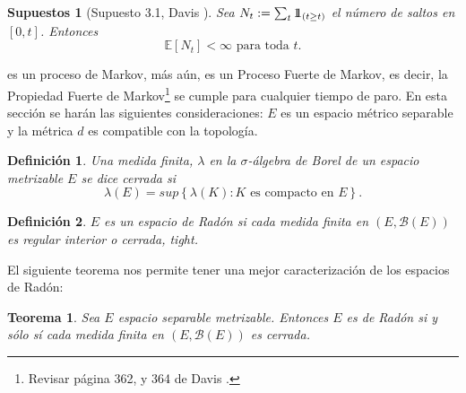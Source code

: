 \documentclass{article}
\newtheorem{Def}{Definición}
\newtheorem{Teo}{Teorema}
\newtheorem{Sup}{Supuestos}
\newcommand{\esp}{\mathbb{E}}
\newcommand{\indora}{\mbox{$1$\hspace{-0.8ex}$1$}}
\begin{document}
\begin{Sup}[Supuesto 3.1, Davis \cite{Davis}]\label{Sup3.1.Davis}
Sea $N_{t}:=\sum_{t}\indora_{\left(t\geq t\right)}$ el n\'umero de
saltos en $\left[0,t\right]$. Entonces
\begin{equation}
\esp\left[N_{t}\right]<\infty\textrm{ para toda }t.
\end{equation}
\end{Sup}

es un proceso de Markov, m\'as a\'un, es un Proceso Fuerte de
Markov, es decir, la Propiedad Fuerte de Markov\footnote{Revisar
p\'agina 362, y 364 de Davis \cite{Davis}.} se cumple para
cualquier tiempo de paro.
En esta secci\'on se har\'an las siguientes consideraciones: $E$
es un espacio m\'etrico separable y la m\'etrica $d$ es compatible
con la topolog\'ia.

\begin{Def}
Una medida finita, $\lambda$ en la $\sigma$-\'algebra de Borel de
un espacio metrizable $E$ se dice cerrada si
\begin{equation}\label{Eq.A2.3}
\lambda\left(E\right)=sup\left\{\lambda\left(K\right):K\textrm{ es
compacto en }E\right\}.
\end{equation}
\end{Def}

\begin{Def}
$E$ es un espacio de Rad\'on si cada medida finita en
$\left(E,\mathcal{B}\left(E\right)\right)$ es regular interior o cerrada,
{\em tight}.
\end{Def}


El siguiente teorema nos permite tener una mejor caracterizaci\'on de los espacios de Rad\'on:
\begin{Teo}\label{Tma.A2.2}
Sea $E$ espacio separable metrizable. Entonces $E$ es de Rad\'on
si y s\'olo s\'i cada medida finita en
$\left(E,\mathcal{B}\left(E\right)\right)$ es cerrada.
\end{Teo}

\end{document}
